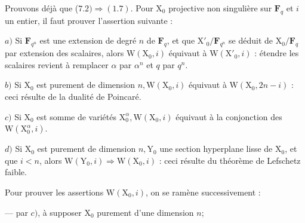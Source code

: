 \documentclass[10pt,leqno]{article}
\begin{document}
\clearpage

\endgroup

\label{physical-30}

\noindent Prouvons déjà que (\(7.2)\Rightarrow (1.7)\). Pour \(\mathrm{X}_{0}\) projective non singulière sur \(\mathbf{F}_{q}\) et \(i\) un entier, il faut prouver l’assertion suivante :\par

\par

\noindent \(a)\) Si \(\mathbf{F}_{q^{n}}\) est une extension de degré \(n\) de \(\mathbf{F}_{q}\), et que \(\mathrm{X}'_{0}/\mathbf{F}_{q^{n}}\) se déduit de \(\mathrm{X}_{0}/\mathbf{F}_{q}\) par extension des scalaires, alors \(\mathrm{W}(\mathrm{X}_{0},i)\) équivaut à \(\mathrm{W}(\mathrm{X}'_{0},i)\) : étendre les scalaires revient à remplacer \(\alpha \) par \(\alpha ^{n}\) et \(q\) par \(q^{n}\).\par

\noindent \(b)\) Si \(\mathrm{X}_{0}\) est purement de dimension \(n, \mathrm{W}(\mathrm{X}_{0},i)\) équivaut à \(\mathrm{W}(\mathrm{X}_{0},2n- i)\) : ceci résulte de la dualité de Poincaré.\par

\noindent \(c)\) Si \(\mathrm{X}_{0}\) est somme de variétés \(\mathrm{X}_{0}^{\alpha }, \mathrm{W}(\mathrm{X}_{0},i)\) équivaut à la conjonction des \(\mathrm{W}(\mathrm{X}_{0}^{\alpha },i)\).\par

\noindent \(d)\) Si \(\mathrm{X}_{0}\) est purement de dimension \(n, \mathrm{Y}_{0}\) une section hyperplane lisse de \(\mathrm{X}_{0}\), et que \(i<n\), alors \(\mathrm{W}(\mathrm{Y}_{0},i)\Rightarrow \mathrm{W}(\mathrm{X}_{0},i)\) : ceci résulte du théorème de Lefschetz faible.\par

\noindent Pour prouver les assertions \(\mathrm{W}(\mathrm{X}_{0},i)\), on se ramène successivement :\par

\noindent — par \(c)\), à supposer \(\mathrm{X}_{0}\) purement d’une dimension \(n\);\par
\end{document}

